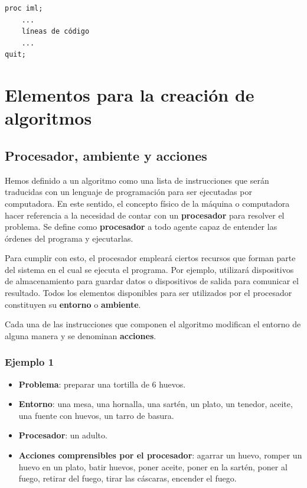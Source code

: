 \documentclass[]{book}
\providecommand{\tightlist}{%
  \setlength{\itemsep}{0pt}\setlength{\parskip}{0pt}}
\begin{document}
\begin{verbatim}
proc iml;
    ...
    líneas de código
    ...
quit;
\end{verbatim}

\chapter{Elementos para la creación de
algoritmos}\label{elementos-para-la-creacion-de-algoritmos}

\section{Procesador, ambiente y
acciones}\label{procesador-ambiente-y-acciones}

Hemos definido a un algoritmo como una lista de instrucciones que serán
traducidas con un lenguaje de programación para ser ejecutadas por
computadora. En este sentido, el concepto físico de la máquina o
computadora hacer referencia a la necesidad de contar con un
\textbf{procesador} para resolver el problema. Se define como
\textbf{procesador} a todo agente capaz de entender las órdenes del
programa y ejecutarlas.

Para cumplir con esto, el procesador empleará ciertos recursos que
forman parte del sistema en el cual se ejecuta el programa. Por ejemplo,
utilizará dispositivos de almacenamiento para guardar datos o
dispositivos de salida para comunicar el resultado. Todos los elementos
disponibles para ser utilizados por el procesador constituyen su
\textbf{entorno} o \textbf{ambiente}.

Cada una de las instrucciones que componen el algoritmo modifican el
entorno de alguna manera y se denominan \textbf{acciones}.

\subsection{Ejemplo 1}\label{ejemplo-1}

\begin{itemize}
\tightlist
\item
  \textbf{Problema}: preparar una tortilla de 6 huevos.
\item
  \textbf{Entorno}: una mesa, una hornalla, una sartén, un plato, un
  tenedor, aceite, una fuente con huevos, un tarro de basura.
\item
  \textbf{Procesador}: un adulto.
\item
  \textbf{Acciones comprensibles por el procesador}: agarrar un huevo,
  romper un huevo en un plato, batir huevos, poner aceite, poner en la
  sartén, poner al fuego, retirar del fuego, tirar las cáscaras,
  encender el fuego.
\end{itemize}
\end{document}
